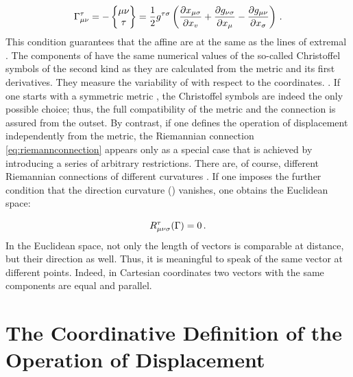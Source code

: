 \documentclass[submitted]{article}
\begin{document}
\begin{equation}\label{eq:riemannconnection}
\Gamma^\tau_{\mu\nu}=-\begin{Bmatrix} \mu \nu \\ \tau \end{Bmatrix} = \frac{1}{2} {g}^{\tau \sigma}\left(\frac{\partial {x}_{\mu \sigma}}{\partial {x}_{v}}+\frac{\partial {g}_{\nu \sigma}}{\partial {x}_{\mu}}-\frac{\partial {g}_{\mu \nu}}{\partial {x}_{\sigma}}\right)\,.
\end{equation}
%
This condition guarantees that the affine  are at the same as the lines of extremal . The components of \Gtmn have the same numerical values of the so-called Christoffel symbols of the second kind as they are calculated from the metric \gmn and its first derivatives. They measure the variability of \gmn with respect to the coordinates. . If one starts with a symmetric metric \gmn, the Christoffel symbols are indeed the only possible choice; thus, the full compatibility of the metric and the connection is assured from the outset. By contrast, if one defines the operation of displacement independently from the metric, the Riemannian connection \cref{eq:riemannconnection} appears only as a special case that is achieved by introducing a series of arbitrary restrictions. There are, of course, different Riemannian connections of different curvatures \ritea. If one imposes the further condition that the direction curvature () vanishes, one obtains the Euclidean space:

 \begin{equation*}
 R_{\mu \nu \sigma}^{\tau}(\Gamma)=0\,.
 \end{equation*}
%
In the Euclidean space, not only the length of vectors is comparable at distance, but their direction as well. Thus, it is meaningful to speak of the same vector at different points. Indeed, in Cartesian coordinates two vectors with the same components are equal and parallel.


\section{The Coordinative Definition of the Operation of Displacement}

\end{document}
